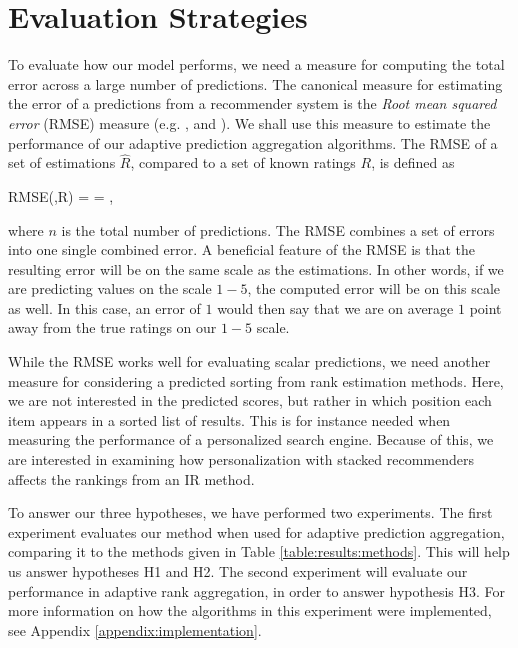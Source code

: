 \section{Evaluation Strategies}

To evaluate how our model performs, we need a measure
for computing the total error across a large number of predictions.
The canonical measure for estimating the error of a 
predictions from a recommender system
is the \emph{Root mean squared error} (RMSE) measure
(e.g. \citet[p17]{Herlocker2004}, \citet[p13]{Adomavicius2005} and \citet[p6]{Bell2007}).
We shall use this measure to estimate the performance
of our adaptive prediction aggregation algorithms.
The RMSE of a set of estimations $\hat{R}$, 
compared to a set of known ratings $R$, is defined as

\begin{eqsp}
  RMSE(,R) = 
  = ,
\end{eqsp}
%
where $n$ is the total number of predictions.
The RMSE combines a set of errors into one single combined error.
A beneficial feature of the RMSE is that the resulting error 
will be on the same scale as the estimations. In other words,
if we are predicting values on the scale $1-5$, the computed error
will be on this scale as well. In this case, an error of $1$
would then say that we are on average $1$ point away from the true 
ratings on our $1-5$ scale.

While the RMSE works well for evaluating scalar predictions,
we need another measure for considering a predicted sorting 
from rank estimation methods.
Here, we are not interested in the predicted scores,
but rather in which position each item appears in a sorted list of results.
This is for instance needed when measuring the performance of a
personalized search engine.
Because of this, we are interested in examining how 
personalization with stacked recommenders affects the rankings
from an IR method.

To answer our three hypotheses, we have performed two experiments.
The first experiment evaluates our method when used for
adaptive prediction aggregation, comparing it to 
the methods given in Table \ref{table:results:methods}.
This will help us answer hypotheses H1 and H2.
The second experiment will evaluate our performance
in adaptive rank aggregation, in order to answer hypothesis H3.
For more information on how the algorithms
in this experiment were implemented, see Appendix \ref{appendix:implementation}.



